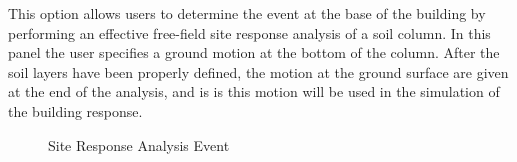 This option allows users to determine the event at the base of the 
building by performing an effective free-field site response 
analysis of a soil column. In this panel the user specifies a ground 
motion at the bottom of the column. After the soil layers have been properly 
defined, the motion at the ground surface are given at the end 
of the analysis, and is is this motion will be used in the 
simulation of the building response. 

\begin{figure}[!htbp]
  \caption{Site Response Analysis Event}
  \label{fig:s3hark1}
\end{figure}

